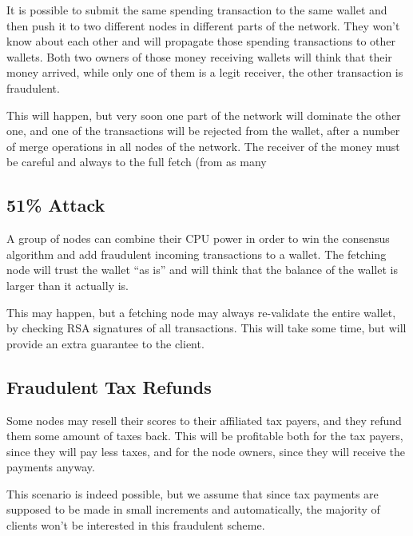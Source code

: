 \documentclass[11pt,oneside]{article}
\begin{document}
It is possible to submit the same spending transaction to the same wallet
and then push it to two different nodes in different parts of the network.
They won't know about each other and will propagate those spending
transactions to other wallets. Both two owners of those money receiving
wallets will think that their money arrived, while only one of them is
a legit receiver, the other transaction is fraudulent.

This will happen, but very soon one part of the network will dominate the other
one, and one of the transactions will be rejected from the wallet, after
a number of merge operations in all nodes of the network. The receiver of the
money must be careful and always to the full fetch (from as many

\subsection{51\% Attack}

A group of nodes can combine their CPU power in order to win the consensus
algorithm and add fraudulent incoming transactions to a wallet.
The fetching node will trust the wallet ``as is'' and will think that the
balance of the wallet is larger than it actually is.

This may happen, but a fetching node may always re-validate the entire wallet,
by checking RSA signatures of all transactions. This will take some time, but will
provide an extra guarantee to the client.

\subsection{Fraudulent Tax Refunds}

Some nodes may resell their scores to their affiliated tax payers, and they
refund them some amount of taxes back. This will be profitable both for
the tax payers, since they will pay less taxes, and for the node owners,
since they will receive the payments anyway.

This scenario is indeed possible, but we assume that since tax payments are
supposed to be made in small increments and automatically, the majority of
clients won't be interested in this fraudulent scheme.

\printbibliography%
\end{document}
